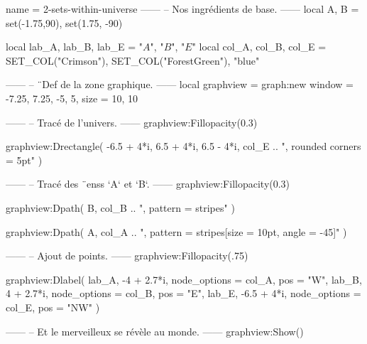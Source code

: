 \documentclass{standalone}
\begin{document}
\begin{luadraw}{name = 2-sets-within-universe}
------
-- Nos ingrédients de base.
------
local A, B = set(-1.75,90), set(1.75, -90)

local lab_A, lab_B, lab_E = "$A$", "$B$", "$E$"
local col_A, col_B, col_E = SET_COL("Crimson"), SET_COL("ForestGreen"), "blue"

------
-- ¨Def de la zone graphique.
------
local graphview = graph:new{
  window = {-7.25, 7.25, -5, 5},
  size   = {10, 10}
}

------
-- Tracé de l'univers.
------
graphview:Fillopacity(0.3)

graphview:Drectangle(
  -6.5 + 4*i, 6.5 + 4*i, 6.5 - 4*i,
  col_E .. ", rounded corners = 5pt"
)

------
-- Tracé des ¨enss `A` et `B`.
------
graphview:Fillopacity(0.3)

graphview:Dpath(
  B,
  col_B .. ", pattern = stripes"
)

graphview:Dpath(
  A,
  col_A .. ", pattern = {stripes[size = 10pt, angle = -45]}"
)

------
-- Ajout de points.
------
graphview:Fillopacity(.75)

graphview:Dlabel(
  lab_A, -4 + 2.7*i, {node_options = col_A, pos = "W"},
  lab_B,  4 + 2.7*i, {node_options = col_B, pos = "E"},
  lab_E, -6.5 + 4*i, {node_options = col_E, pos = "NW"}
)

------
-- Et le merveilleux se révèle au monde.
------
graphview:Show()
\end{luadraw}
\end{document}
